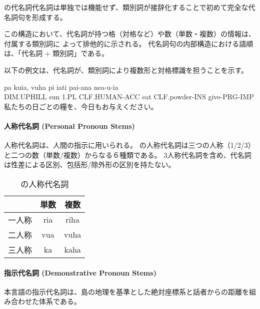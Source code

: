 \langname の代名詞代名詞は単独では機能せず、類別詞が接辞化することで初めて完全な代名詞句を形成する。

この構造において、代名詞が持つ格（対格など）や数（単数・複数）の情報は、付属する類別詞に
よって排他的に示される。
代名詞句の内部構造における語順は、「代名詞 + 類別詞」である。

以下の例文は、代名詞が、類別詞により複数形と対格標識を担うことを示す。

\begin{exe}
    \ex \gll pa kuia, vuha pi iati pai-ana nea-u-ia \\
        DIM.UPHILL sun 1.PL CLF.HUMAN-ACC eat CLF.powder-INS give-PRG-IMP \\
        \glt 私たちの日ごとの糧を、今日もお与えください。
\end{exe}

\paragraph{人称代名詞 (Personal Pronoun Stems)}
人称代名詞は、人間の指示に用いられる。
\langname の人称代名詞は三つの人称（1/2/3）と二つの数（単数/複数）からなる６種類である。
3人称代名詞を含め、代名詞は性差による区別、包括形/除外形の区別を持たない。

\begin{table}[H]
    \centering
    \begin{tabular}{lcc}
        \toprule
        & 単数 & 複数  \\
        \midrule
        一人称 & ria & riha \\
        二人称 & vua & vuha \\
        三人称 & ka & kaha \\
        \bottomrule
    \end{tabular}
    \caption{\centering \langname の人称代名詞}
    \label{tab:pronouns}
\end{table}

\paragraph{指示代名詞 (Demonstrative Pronoun Stems)}
本言語の指示代名詞は、島の地理を基準とした絶対座標系と話者からの距離を組み合わせた体系である。


